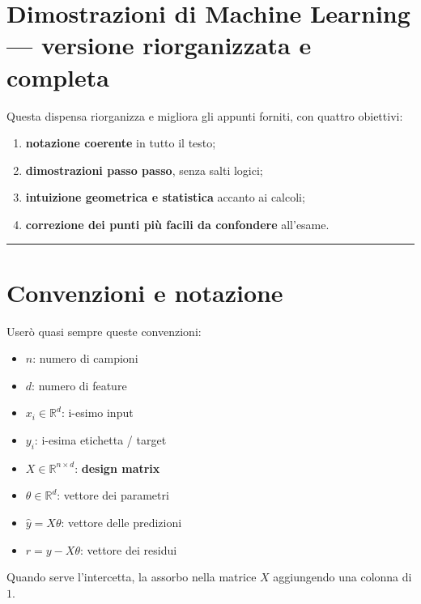 \documentclass[
]{article}
\author{}
\date{}
\providecommand{\tightlist}{%
  \setlength{\itemsep}{0pt}\setlength{\parskip}{0pt}}
\begin{document}
\section{Dimostrazioni di Machine Learning --- versione riorganizzata e
completa}\label{dimostrazioni-di-machine-learning-versione-riorganizzata-e-completa}

Questa dispensa riorganizza e migliora gli appunti forniti, con quattro
obiettivi:

\begin{enumerate}
\def\labelenumi{\arabic{enumi}.}
\tightlist
\item
  \textbf{notazione coerente} in tutto il testo;
\item
  \textbf{dimostrazioni passo passo}, senza salti logici;
\item
  \textbf{intuizione geometrica e statistica} accanto ai calcoli;
\item
  \textbf{correzione dei punti più facili da confondere} all'esame.
\end{enumerate}

\begin{center}\rule{0.5\linewidth}{0.5pt}\end{center}

\section{Convenzioni e notazione}\label{convenzioni-e-notazione}

Userò quasi sempre queste convenzioni:

\begin{itemize}
\tightlist
\item
  \(n\): numero di campioni
\item
  \(d\): numero di feature
\item
  \(x_i \in \mathbb{R}^d\): i-esimo input
\item
  \(y_i\): i-esima etichetta / target
\item
  \(X \in \mathbb{R}^{n \times d}\): \textbf{design matrix}
\item
  \(\theta \in \mathbb{R}^d\): vettore dei parametri
\item
  \(\hat y = X\theta\): vettore delle predizioni
\item
  \(r = y - X\theta\): vettore dei residui
\end{itemize}

Quando serve l'intercetta, la assorbo nella matrice \(X\) aggiungendo
una colonna di \(1\).
\end{document}
